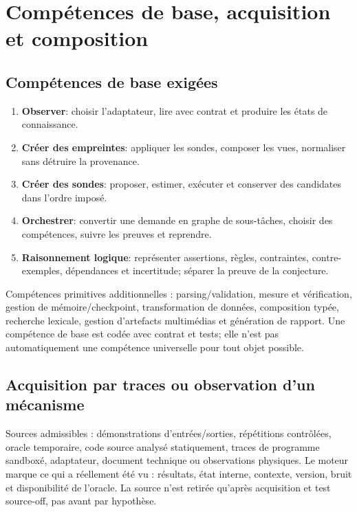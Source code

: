 \documentclass[11pt,a4paper,oneside]{report}
\begin{document}
\chapter{Compétences de base, acquisition et composition}
\section{Compétences de base exigées}
\begin{enumerate}
\item \textbf{Observer}: choisir l'adaptateur, lire avec contrat et produire les états de connaissance.
\item \textbf{Créer des empreintes}: appliquer les sondes, composer les vues, normaliser sans détruire la provenance.
\item \textbf{Créer des sondes}: proposer, estimer, exécuter et conserver des candidates dans l'ordre imposé.
\item \textbf{Orchestrer}: convertir une demande en graphe de sous-tâches, choisir des compétences, suivre les preuves et reprendre.
\item \textbf{Raisonnement logique}: représenter assertions, règles, contraintes, contre-exemples, dépendances et incertitude; séparer la preuve de la conjecture.
\end{enumerate}
Compétences primitives additionnelles : parsing/validation, mesure et vérification, gestion de mémoire/checkpoint, transformation de données, composition typée, recherche lexicale, gestion d'artefacts multimédias et génération de rapport. Une compétence de base est codée avec contrat et tests; elle n'est pas automatiquement une compétence universelle pour tout objet possible.

\section{Acquisition par traces ou observation d'un mécanisme}
Sources admissibles : démonstrations d'entrées/sorties, répétitions contrôlées, oracle temporaire, code source analysé statiquement, traces de programme sandboxé, adaptateur, document technique ou observations physiques. Le moteur marque ce qui a réellement été vu : résultats, état interne, contexte, version, bruit et disponibilité de l'oracle. La source n'est retirée qu'après acquisition et test source-off, pas avant par hypothèse.
\end{document}
